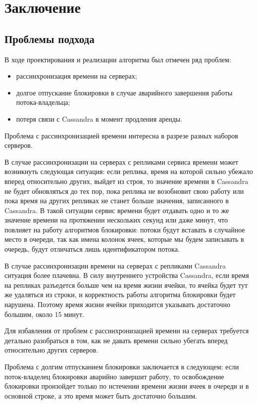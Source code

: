 \section{Заключение}

\subsection{Проблемы подхода}

В ходе проектирования и реализации алгоритма был отмечен ряд проблем:

\begin{itemize}
	\item рассинхронизация времени на серверах;
	\item долгое отпускание блокировки в случае аварийного завершения работы потока-владельца;
	\item потеря связи с Cassandra в момент продления аренды.
\end{itemize}

Проблема с рассинхронизацией времени интересна в разрезе разных наборов серверов.

В случае рассинхронизации на серверах с репликами сервиса времени может возникнуть следующая ситуация: если реплика, время на которой сильно убежало вперед относительно других, выйдет из строя, то значение времени в Cassandra не будет обновляться до тех пор, пока реплика не возобновит свою работу или пока время на других репликах не станет больше значения, записанного в Cassandra. В такой ситуации сервис времени будет отдавать одно и то же значение времени на протяжении нескольких секунд или даже минут, что повлияет на работу алгоритмов блокировки: потоки будут вставать в случайное место в очереди, так как имена колонок ячеек, которые мы будем записывать в очередь, будут отличаться лишь идентификатором потока.

В случае рассинхронизации времени на серверах с репликами Cassandra ситуация более плачевна. В силу внутреннего устройства Cassandra, если время на репликах разъедется больше чем на время жизни ячейки, то ячейка будет тут же удаляться из строки, и корректность работы алгоритма блокировки будет нарушена. Поэтому время жизни ячейки приходится указывать достаточно большим, около 15 минут.

Для избавления от проблем с рассинхронизацией времени на серверах требуется детально разобраться в том, как не давать времени сильно убегать вперед относительно других серверов.

Проблема с долгим отпусканием блокировки заключается в следующем: если поток-владелец блокировки аварийно завершит работу, то освобождение блокировки произойдет только по истечении времени жизни ячеек в очереди и в основной строке, а это время может быть достаточно большим.

